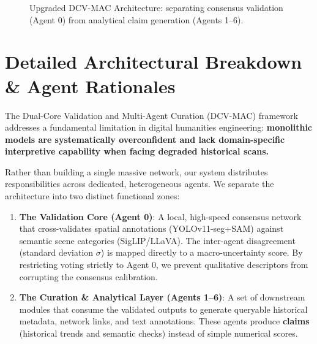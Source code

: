 \documentclass[11pt,a4paper]{article}
\begin{document}
\begin{figure}[h]
\caption{Upgraded DCV-MAC Architecture: separating consensus validation (Agent 0) from analytical claim generation (Agents 1--6).}
\label{fig:architecture}
\end{figure}

\section{Detailed Architectural Breakdown \& Agent Rationales}
The Dual-Core Validation and Multi-Agent Curation (DCV-MAC) framework addresses a fundamental limitation in digital humanities engineering: \textbf{monolithic models are systematically overconfident and lack domain-specific interpretive capability when facing degraded historical scans.} 

Rather than building a single massive network, our system distributes responsibilities across dedicated, heterogeneous agents. We separate the architecture into two distinct functional zones:
\begin{enumerate}
    \item \textbf{The Validation Core (Agent 0)}: A local, high-speed consensus network that cross-validates spatial annotations (YOLOv11-seg+SAM) against semantic scene categories (SigLIP/LLaVA). The inter-agent disagreement (standard deviation $\sigma$) is mapped directly to a macro-uncertainty score. By restricting voting strictly to Agent 0, we prevent qualitative descriptors from corrupting the consensus calibration.
    \item \textbf{The Curation \& Analytical Layer (Agents 1--6)}: A set of downstream modules that consume the validated outputs to generate queryable historical metadata, network links, and text annotations. These agents produce \textbf{claims} (historical trends and semantic checks) instead of simple numerical scores.
\end{enumerate}
\end{document}
